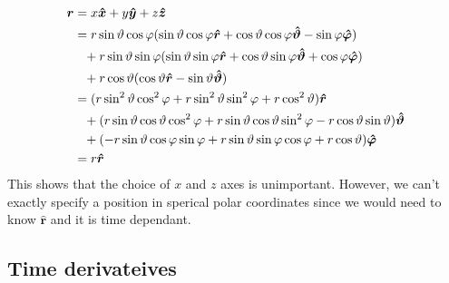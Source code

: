 \documentclass{article}
\newcommand{\vh}[1]{\vec{\hat{#1}}}
\renewcommand{\vec}[1]{\bm{#1}}
\newcommand{\vv}[1]{\vec{#1}}
\begin{document}
\begin{align*}
\vv r &= x\vh x+y\vh y+z\vh z\\
&= r\sin\vartheta\cos\varphi(\sin\vartheta\cos\varphi\vh r+\cos\vartheta\cos\varphi\vh\vartheta-\sin\varphi\vh\varphi)\\
&\hphantom{=}+r\sin\vartheta\sin\varphi(\sin\vartheta\sin\varphi\vh r+\cos\vartheta\sin\varphi\vh \vartheta+\cos\varphi\vh \varphi)\\
&\hphantom{=}+r\cos\vartheta(\cos\vartheta\vh r-\sin\vartheta\vh \vartheta)\\
&=(r\sin^2\vartheta\cos^2\varphi+r\sin^2\vartheta\sin^2\varphi+r\cos^2\vartheta)\vh r\\
&\hphantom{=}+(r\sin\vartheta\cos\vartheta\cos^2\varphi+r\sin\vartheta\cos\vartheta\sin^2\varphi-r\cos\vartheta\sin\vartheta)\vh\vartheta\\
&\hphantom{=}+(-r\sin\vartheta\cos\varphi\sin\varphi+r\sin\vartheta\sin\varphi\cos\varphi+r\cos\vartheta)\vh\varphi\\
&=r\vh r
\end{align*}
This shows that the choice of \(x\) and \(z\) axes is unimportant. However, we can't exactly specify a position in sperical polar coordinates since we would need to know \(\vh r\) and it is time dependant.

\subsection*{Time derivateives}
\end{document}
